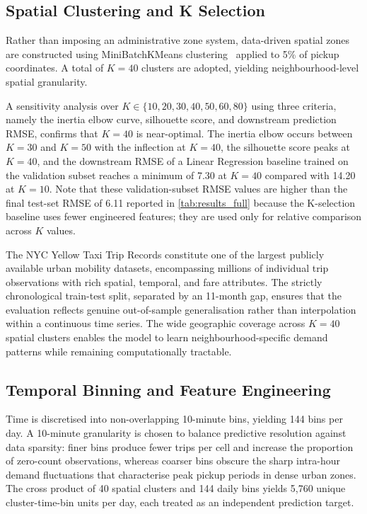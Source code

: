 \documentclass[a4paper,fleqn]{cas-dc}
\begin{document}
\subsection{Spatial Clustering and K Selection}
\label{sec:spatial}

Rather than imposing an administrative zone system, data-driven spatial zones are constructed using MiniBatchKMeans clustering~\cite{kmeans_mini} applied to 5\% of pickup coordinates.  A total of $K=40$ clusters are adopted, yielding neighbourhood-level spatial granularity.

A sensitivity analysis over $K \in \{10, 20, 30, 40, 50, 60, 80\}$ using three criteria, namely the inertia elbow curve, silhouette score, and downstream prediction RMSE, confirms that $K = 40$ is near-optimal.  The inertia elbow occurs between $K=30$ and $K=50$ with the inflection at $K=40$, the silhouette score peaks at $K=40$, and the downstream RMSE of a Linear Regression baseline trained on the validation subset reaches a minimum of 7.30 at $K=40$ compared with 14.20 at $K=10$.  Note that these validation-subset RMSE values are higher than the final test-set RMSE of 6.11 reported in \autoref{tab:results_full} because the K-selection baseline uses fewer engineered features; they are used only for relative comparison across $K$ values.

The NYC Yellow Taxi Trip Records constitute one of the largest publicly available urban mobility datasets, encompassing millions of individual trip observations with rich spatial, temporal, and fare attributes.  The strictly chronological train-test split, separated by an 11-month gap, ensures that the evaluation reflects genuine out-of-sample generalisation rather than interpolation within a continuous time series.  The wide geographic coverage across $K{=}40$ spatial clusters enables the model to learn neighbourhood-specific demand patterns while remaining computationally tractable.

\subsection{Temporal Binning and Feature Engineering}

Time is discretised into non-overlapping 10-minute bins, yielding 144 bins per day.  A 10-minute granularity is chosen to balance predictive resolution against data sparsity: finer bins produce fewer trips per cell and increase the proportion of zero-count observations, whereas coarser bins obscure the sharp intra-hour demand fluctuations that characterise peak pickup periods in dense urban zones.  The cross product of 40 spatial clusters and 144 daily bins yields 5,760 unique cluster-time-bin units per day, each treated as an independent prediction target.
\end{document}
